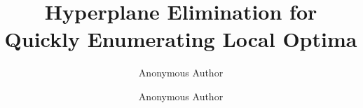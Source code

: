 \documentclass[runningheads,a4paper]{llncs}
\begin{document}
\mainmatter  %

\title{Hyperplane Elimination for Quickly Enumerating Local Optima}


%
%
\author{Anonymous Author\and Anonymous Author}

%


%
%

\maketitle
\end{document}
